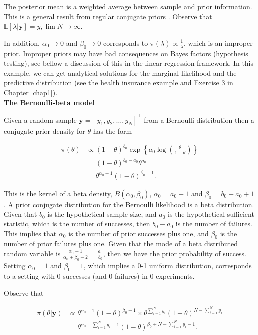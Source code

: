 \begin{enumerate}
The posterior mean is a weighted average between sample and prior information. This is a general result from regular conjugate priors \cite{diaconis1979conjugate}. Observe that $\mathbb{E}\left[\lambda|\mathbf{y}\right]=\bar{y}, \lim N\rightarrow\infty$. 

In addition, $\alpha_0\rightarrow 0$ and $\beta_0\rightarrow 0$ corresponds to $\pi(\lambda)\propto \frac{1}{\lambda}$, which is an improper prior. Improper priors may have bad consequences on Bayes factors (hypothesis testing), see bellow a discussion of this in the linear regression framework. In this example, we can get analytical solutions for the marginal likelihood and the predictive distribution (see the health insurance example and Exercise 3 in Chapter \ref{chap1}).\\ 

\textbf{The Bernoulli-beta model}

Given a random sample $\mathbf{y}=[y_1,y_2,\dots,y_N]^{\top}$ from a Bernoulli distribution then a conjugate prior density for $\theta$ has the form 

\begin{align}
	\pi(\theta)&\propto (1-\theta)^{b_0} \exp\left\{a_0\log\left(\frac{\theta}{1-\theta}\right)\right\}\nonumber\\
	& = (1-\theta)^{b_0-a_0}\theta^{a_0}\nonumber\\
	& = \theta^{\alpha_0-1}(1-\theta)^{\beta_0-1}.\nonumber
\end{align}

This is the kernel of a beta density, $B(\alpha_0,\beta_0)$, $\alpha_0=a_0+1$ and $\beta_0=b_0-a_0+1$. A prior conjugate distribution for the Bernoulli likelihood is a beta distribution. Given that $b_0$ is the hypothetical sample size, and $a_0$ is the hypothetical sufficient statistic, which is the number of successes, then $b_0-a_0$ is the number of failures. This implies that $\alpha_0$ is the number of prior successes plus one, and $\beta_0$ is the number of prior failures plus one. Given that the mode of a beta distributed random variable is $\frac{\alpha_0-1}{\alpha_0+\beta_0-2}=\frac{a_0}{b_0}$, then we have the prior probability of success. Setting $\alpha_0=1$ and $\beta_0=1$, which implies a 0-1 uniform distribution, corresponds to a setting with 0 successes (and 0 failures) in 0 experiments.   

Observe that

\begin{align}
	\pi(\theta|\mathbf{y})&\propto \theta^{\alpha_0-1}(1-\theta)^{\beta_0-1} \times \theta^{\sum_{i=1}^N y_i}(1-\theta)^{N-\sum_{i=1}^Ny_i}\nonumber\\
	&= \theta^{\alpha_0+\sum_{i=1}^N y_i-1}(1-\theta)^{\beta_0+N-\sum_{i=1}^Ny_i-1}.\nonumber 
\end{align}


\end{enumerate}

